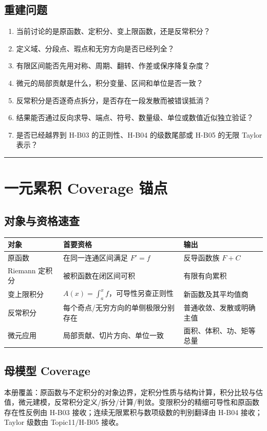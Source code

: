 \documentclass[11pt,a4paper,fontset=fandol]{ctexart}
\begin{document}
\subsection{重建问题}
\begin{enumerate}
  \item 当前讨论的是原函数、定积分、变上限函数，还是反常积分？
  \item 定义域、分段点、瑕点和无穷方向是否已经列全？
  \item 有限区间能否先用对称、周期、翻转、作差或保序降复杂度？
  \item 微元的局部贡献是什么，积分变量、区间和单位是否一致？
  \item 反常积分是否逐奇点拆分，是否存在一段发散而被错误抵消？
  \item 结果能否通过反向求导、端点、符号、数量级、单位或数值近似独立验证？
  \item 是否已经越界到 H-B03 的正则性、H-B04 的级数尾部或 H-B05 的无限 Taylor 表示？
\end{enumerate}

\begin{center}\rule{0.5\linewidth}{0.5pt}\end{center}

\appendix
\section{一元累积 Coverage 锚点}

\subsection{对象与资格速查}
\begin{center}
\begin{tabular}{L{2.55cm}L{5.15cm}L{\dimexpr\linewidth-7.70cm\relax}}
\toprule
对象 & 首要资格 & 输出\\
\midrule
原函数 & 在同一连通区间满足 $F'=f$ & 反导函数族 $F+C$\\
Riemann 定积分 & 被积函数在闭区间可积 & 有限有向累积\\
变上限积分 & $A(x)=\int_a^x{f}$，可导性另查正则性 & 新函数及其平均值商\\
反常积分 & 每个奇点/无穷方向的单侧极限分别存在 & 普通收敛、发散或明确主值\\
微元应用 & 局部贡献、切片方向、单位一致 & 面积、体积、功、矩等总量\\
\bottomrule
\end{tabular}
\end{center}

\subsection{母模型 Coverage}

本册覆盖：原函数与不定积分的对象边界，定积分性质与结构计算，积分比较与估值，微元建模，反常积分定义/拆分/计算/判敛。变限积分的精细可导性和原函数存在性反例由 H-B03 接收；连续无限累积与数项级数的判别翻译由 H-B04 接收；Taylor 级数由 Topic11/H-B05 接收。
\end{document}
